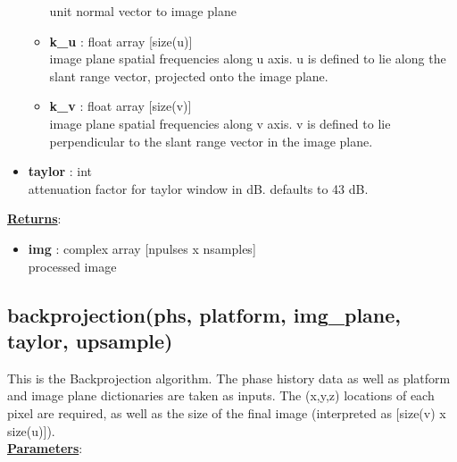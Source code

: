 \documentclass{article}
\newcommand{\defs}[2]{\textbf{{#1}} : {#2}}
\begin{document}
\begin{itemize}
\begin{itemize}
	    	unit normal vector to image plane
	    \item \defs{k\_u}{float array [size(u)]}\\
	    	image plane spatial frequencies along u axis.  u is defined to lie along the slant range vector, projected onto the image plane.
	    \item \defs{k\_v}{float array [size(v)]}\\
	    	image plane spatial frequencies along v axis.  v is defined to lie perpendicular to the slant range vector in the image plane.
	\end{itemize}
	\item\defs{taylor}{int}\\
	attenuation factor for taylor window in dB.  defaults to 43 dB.
\end{itemize}

\noindent \underline{\textbf{Returns}}:
\begin{itemize}
	\item \defs{img}{complex array [npulses x nsamples]}\\
	processed image
\end{itemize}

\subsection{backprojection(phs, platform, img\_plane, taylor, \mbox{upsample})}
This is the Backprojection algorithm.  The phase history data as well as platform and image plane dictionaries are taken as inputs.  The (x,y,z) locations of each pixel are required, as well as the size of the final image (interpreted as [size(v) x size(u)]).\\

\noindent \underline{\textbf{Parameters}}:
\end{document}
